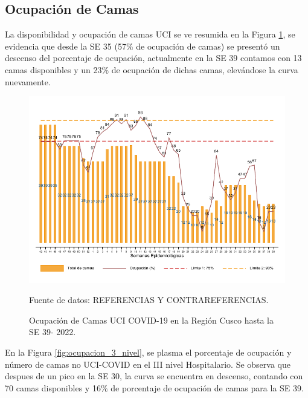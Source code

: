 \documentclass[12pt,a4paper,openany]{book}
\begin{document}
	\clearpage
	\subsection*{Ocupación de Camas}
	\noindent La disponibilidad y ocupación de camas UCI se ve resumida en la Figura \ref{fig:ocupacion_uci}, se evidencia que desde la SE 35 (57$\%$ de ocupación de camas) se presentó un descenso del porcentaje de ocupación, actualmente en la SE 39 contamos con 13 camas disponibles y un 23$\%$ de ocupación de dichas camas, elevándose la curva nuevamente.
	
	\begin{figure}[h]
		\caption{Ocupación de Camas UCI COVID-19 en la Región Cusco hasta la SE 39- 2022.}\label{fig:ocupacion_uci}
		\begin{center}
			\includegraphics[width=0.95\linewidth]{../figuras/uci.pdf}
		\end{center}
		{\footnotesize {Fuente de datos: REFERENCIAS Y CONTRAREFERENCIAS.}}
	\end{figure}
	\cleardoublepage
	
	En la Figura \ref{fig:ocupacion_3_nivel}, se plasma el porcentaje de ocupación y número de camas no UCI-COVID en el III nivel Hospitalario. Se observa que despues de un pico en la SE 30, la curva se encuentra en descenso, contando con 70 camas disponibles y 16$\%$ de porcentaje de ocupación de camas para la SE 39.
	
\end{document}
